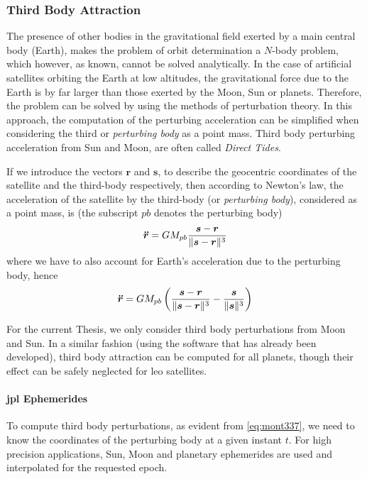\subsubsection{Third Body Attraction}\label{sssec:third-body-perturbations}

The presence of other bodies in the gravitational field exerted by a main central
body (Earth), makes the problem of orbit determination a $N$-body problem, which however, 
as known, cannot be solved analytically. In the case of artificial satellites orbiting 
the Earth at low altitudes, the gravitational force due to the Earth is by far larger 
than those exerted by the Moon, Sun or planets. Therefore, the problem can be solved 
by using the methods of perturbation theory. In this approach, the computation of the 
perturbing acceleration can be simplified when considering the third or \emph{perturbing body} 
as a point mass. Third body perturbing acceleration from Sun and Moon, are often 
called \emph{Direct Tides}.

If we introduce the vectors $\bm{r}$ and $\bm{s}$, to describe the geocentric 
coordinates of the satellite and the third-body respectively, then according to 
Newton's law, the acceleration of the satellite by the third-body (or \emph{perturbing body}), 
considered as a point mass, is (the subscript $pb$ denotes the perturbing body)
\begin{equation}
    \bm{\ddot{r}} = GM_{pb} \frac{\bm{s}-\bm{r}}
        {\lVert\bm{s}-\bm{r}\rVert^3}
\end{equation}
where we have to also account for Earth's acceleration due to the perturbing body, 
hence
\begin{equation}\label{eq:mont337}
    \bm{\ddot{r}} = GM_{pb} \left( 
        \frac{\bm{s}-\bm{r}}{\lVert\bm{s}-\bm{r}\rVert^3} 
        - \frac{\bm{s}}{\lVert\bm{s}\rVert^3} \right)
\end{equation}

For the current Thesis, we only consider third body perturbations from Moon and Sun. 
In a similar fashion (using the software that has already been developed), third body 
attraction can be computed for all planets, though their effect can be safely neglected 
for \gls{leo} satellites.

\paragraph{\gls{jpl} Ephemerides}\label{par:jpl-ephemerides}

To compute third body perturbations, as evident from \autoref{eq:mont337}, we need to 
know the coordinates of the perturbing body at a given instant $t$. For high 
precision applications, Sun, Moon and planetary ephemerides are used and interpolated 
for the requested epoch.

